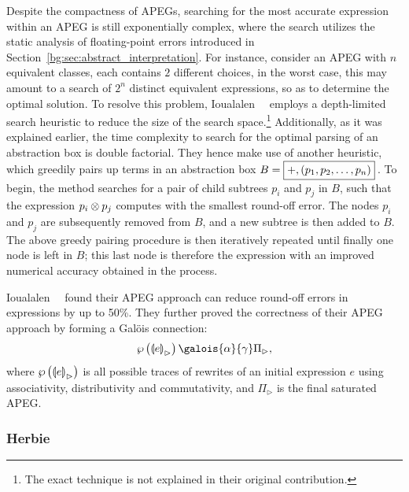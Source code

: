 Despite the compactness of APEGs, searching for the most accurate
expression within an APEG is still exponentially complex, where the search
utilizes the static analysis of floating-point errors introduced in
Section~\ref{bg:sec:abstract_interpretation}.  For instance, consider an
APEG with $n$ equivalent classes, each contains $2$ different choices, in
the worst case, this may amount to a search of $2^n$ distinct equivalent
expressions, so as to determine the optimal solution.  To resolve this
problem, Ioualalen~\etal~\cite{ioualalen} employs a depth-limited search
heuristic to reduce the size of the search space.\footnote{The exact technique
is not explained in their original contribution.}  Additionally, as it was
explained earlier, the time complexity to search for the optimal parsing of an
abstraction box is double factorial.  They hence make use of another heuristic,
which greedily pairs up terms in an abstraction box $B = \text{\fbox{$+,
\left(p_1, p_2, \mathellipsis, p_n\right)$}}$\,.  To begin, the method searches
for a pair of child subtrees $p_i$ and $p_j$ in $B$, such that the expression
$p_i \otimes p_j$ computes with the smallest round-off error.  The nodes
$p_i$ and $p_j$ are subsequently removed from $B$, and a new subtree
is then added to $B$.  The above greedy pairing procedure is then iteratively
repeated until finally one node is left in $B$; this last node is therefore
the expression with an improved numerical accuracy obtained in the process.

Ioualalen~\etal~\cite{ioualalen} found their APEG approach can reduce round-off
errors in expressions by up to 50\%.  They further proved the correctness of
their APEG approach by forming a Gal\"ois connection:
\begin{equation}
    \powersetof{{\llparenthesis e \rrparenthesis}_\rhd}
    \galois{\alpha}{\gamma}
    \Pi_\rhd,
\end{equation}
where $\wp\left({{\llparenthesis e \rrparenthesis}_\rhd}\right)$ is all possible
traces of rewrites of an initial expression $e$ using associativity,
distributivity and commutativity, and $\Pi_\rhd$ is the final saturated APEG\@.

\subsubsection{Herbie}

